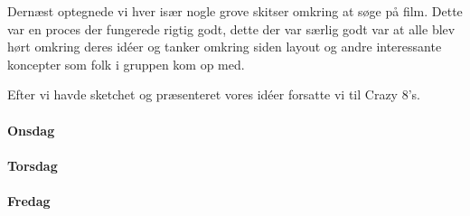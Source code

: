\documentclass{article}
\begin{document}
Dernæst optegnede vi hver især nogle grove skitser omkring at søge på film.
Dette var en proces der fungerede rigtig godt, dette der var særlig godt var at
alle blev hørt omkring deres idéer og tanker omkring siden layout og andre
interessante koncepter som folk i gruppen kom op med.

Efter vi havde sketchet og præsenteret vores idéer forsatte vi til Crazy 8's.

\paragraph{Onsdag}

\paragraph{Torsdag}


\paragraph{Fredag}


\end{document}
